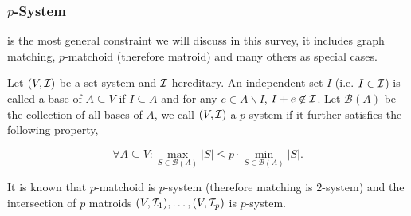 \subsubsection{$p$-System}
 is the most general constraint we will discuss in this survey, it includes graph matching, $p$-matchoid (therefore matroid) and many others as special cases.

Let $(V, \mathcal{I})$ be a set system and $\mathcal{I}$ hereditary. An independent set $I$ (i.e. $I\in\mathcal{I}$) is called a base of $A \subseteq V$ if $I\subseteq A$ and for any $e \in A\backslash I$, $I + e\not\in \mathcal{I}$.  Let $\mathcal{B}(A)$ be the collection of all bases of $A$, we call $(V, \mathcal{I})$ a $p$-system if it further satisfies the following property,

$$\forall A\subseteq V: \max_{S\in\mathcal{B}(A)}|S| \leq p\cdot \min_{S\in\mathcal{B}(A)}|S|.$$

It is known that $p$-matchoid is $p$-system (therefore matching is $2$-system) and the intersection of $p$ matroids $(V, \mathcal{I}_1), \ldots, (V, \mathcal{I}_p)$ is $p$-system. 





